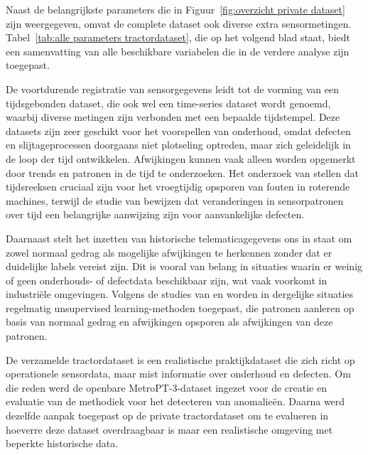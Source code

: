 \newpage

Naast de belangrijkste parameters die in Figuur~\ref{fig:overzicht private dataset} zijn weergegeven, omvat de complete dataset ook diverse extra sensormetingen. Tabel~\ref{tab:alle parameters tractordataset}, die op het volgend blad staat, biedt een samenvatting van alle beschikbare variabelen die in de verdere analyse zijn toegepast.


De voortdurende registratie van sensorgegevens leidt tot de vorming van een tijdsgebonden dataset, die ook wel een time-series dataset wordt genoemd, waarbij diverse metingen zijn verbonden met een bepaalde tijdstempel. Deze datasets zijn zeer geschikt voor het voorspellen van onderhoud, omdat defecten en slijtageprocessen doorgaans niet plotseling optreden, maar zich geleidelijk in de loop der tijd ontwikkelen. Afwijkingen kunnen vaak alleen worden opgemerkt door trends en patronen in de tijd te onderzoeken. Het onderzoek van \textcite{Lu2026} stellen dat tijdsreeksen cruciaal zijn voor het vroegtijdig opsporen van fouten in roterende machines, terwijl de studie van \textcite{WangXueyi2025} bewijzen dat veranderingen in sensorpatronen over tijd een belangrijke aanwijzing zijn voor aanvankelijke defecten.

Daarnaast stelt het inzetten van historische telematicagegevens ons in staat om zowel normaal gedrag als mogelijke afwijkingen te herkennen zonder dat er duidelijke labels vereist zijn. Dit is vooral van belang in situaties waarin er weinig of geen onderhouds- of defectdata beschikbaar zijn, wat vaak voorkomt in industriële omgevingen. Volgens de studies van \textcite{Giannoulidis2024} en \textcite{Dissem2024} worden in dergelijke situaties regelmatig unsupervised learning-methoden toegepast, die patronen aanleren op basis van normaal gedrag en afwijkingen opsporen als afwijkingen van deze patronen.

De verzamelde tractordataset is een realistische praktijkdataset die zich richt op operationele sensordata, maar mist informatie over onderhoud en defecten. Om die reden werd de openbare MetroPT-3-dataset ingezet voor de creatie en evaluatie van de methodiek voor het detecteren van anomalieën. Daarna werd dezelfde aanpak toegepast op de private tractordataset om te evalueren in hoeverre deze dataset overdraagbaar is maar een realistische omgeving met beperkte historische data.

